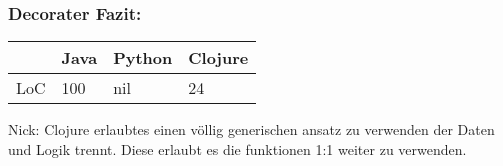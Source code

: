 \documentclass[compress, blue]{beamer}
\begin{document}





\begin{frame}\frametitle{Decorater Fazit:}
    \begin{tabular}{l | l l l}
     & Java &  Python & Clojure  \\
     \hline
    LoC & 100 &  nil & 24  \\
  \end{tabular}
  \begin{block}{Nick: }
    Clojure erlaubtes einen völlig generischen ansatz zu verwenden der
    Daten und Logik trennt. Diese erlaubt es die funktionen 1:1 weiter
    zu verwenden.
  \end{block}
\end{frame}
\end{document}
